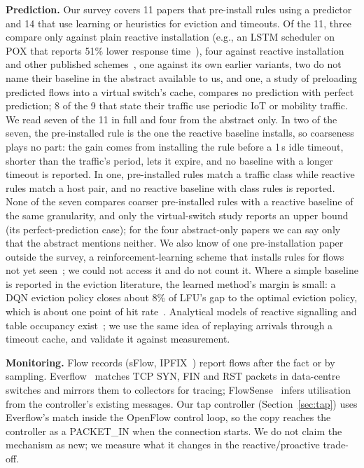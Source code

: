 \documentclass[sigconf]{acmart}
\begin{document}
\textbf{Prediction.} Our survey covers 11 papers that pre-install rules using a predictor and 14 that use learning or heuristics for eviction and timeouts. Of the 11, three compare only against plain reactive installation (e.g., an LSTM scheduler on POX that reports 51\% lower response time~\cite{batista2024}), four against reactive installation and other published schemes~\cite{kim2022}, one against its own earlier variants, two do not name their baseline in the abstract available to us, and one, a study of preloading predicted flows into a virtual switch's cache, compares no prediction with perfect prediction; 8 of the 9 that state their traffic use periodic IoT or mobility traffic. We read seven of the 11 in full and four from the abstract only. In two of the seven, the pre-installed rule is the one the reactive baseline installs, so coarseness plays no part: the gain comes from installing the rule before a 1\,s idle timeout, shorter than the traffic's period, lets it expire, and no baseline with a longer timeout is reported. In one, pre-installed rules match a traffic class while reactive rules match a host pair, and no reactive baseline with class rules is reported. None of the seven compares coarser pre-installed rules with a reactive baseline of the same granularity, and only the virtual-switch study reports an upper bound (its perfect-prediction case); for the four abstract-only papers we can say only that the abstract mentions neither. We also know of one pre-installation paper outside the survey, a reinforcement-learning scheme that installs rules for flows not yet seen~\cite{hariri2024}; we could not access it and do not count it. Where a simple baseline is reported in the eviction literature, the learned method's margin is small: a DQN eviction policy closes about 8\% of LFU's gap to the optimal eviction policy, which is about one point of hit rate~\cite{rouf2025}. Analytical models of reactive signalling and table occupancy exist~\cite{metter2017}; we use the same idea of replaying arrivals through a timeout cache, and validate it against measurement.

\textbf{Monitoring.} Flow records (sFlow, IPFIX~\cite{ipfix}) report flows after the fact or by sampling. Everflow~\cite{everflow} matches TCP SYN, FIN and RST packets in data-centre switches and mirrors them to collectors for tracing; FlowSense~\cite{flowsense} infers utilisation from the controller's existing messages. Our tap controller (Section~\ref{sec:tap}) uses Everflow's match inside the OpenFlow control loop, so the copy reaches the controller as a PACKET\_IN when the connection starts. We do not claim the mechanism as new; we measure what it changes in the reactive/proactive trade-off.
\end{document}
